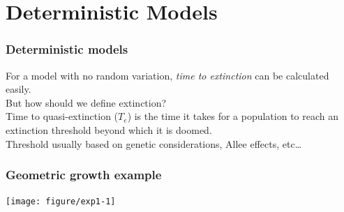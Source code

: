 \documentclass[color=usenames,dvipsnames]{beamer}\usepackage[]{graphicx}\usepackage[]{color}
\begin{document}
\section{Deterministic Models}






\begin{frame}
  \frametitle{Deterministic models}
  \Large
  For a model with no random variation, \textit{time to extinction} can
      be calculated easily. \\
  \pause \vfill
  But how should we define extinction? \\
  \pause \vfill
  Time to quasi-extinction ($T_e$) is the time it takes for a
      population to reach an extinction threshold beyond which it is
      doomed. \\
  \pause \vfill
  Threshold usually based on genetic considerations, Allee
      effects, etc\dots
\end{frame}





\begin{frame}[fragile]
  \frametitle{Geometric growth example}

\texttt{[image: figure/exp1-1]}
\end{frame}
\end{document}
